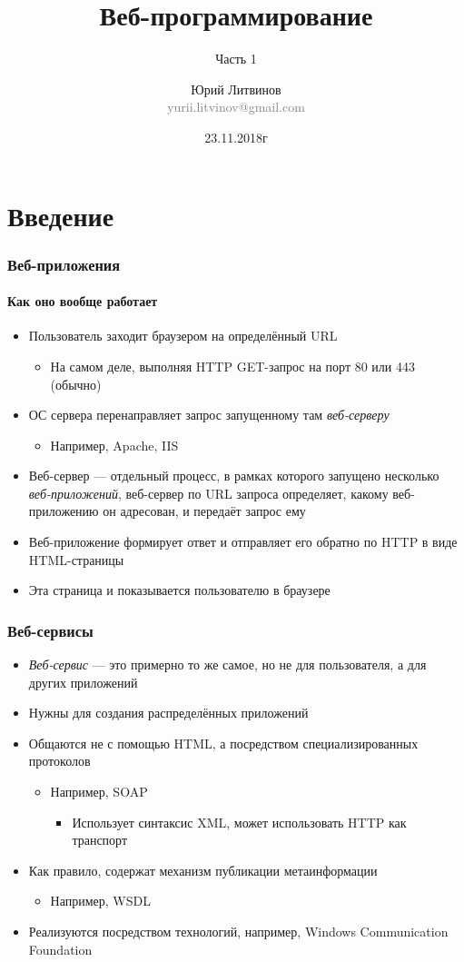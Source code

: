 \documentclass[xetex,mathserif,serif]{beamer}
\title{Веб-программирование}
\subtitle{Часть 1}
\author[Юрий Литвинов]{Юрий Литвинов\\\small{\textcolor{gray}{yurii.litvinov@gmail.com}}}
\date{23.11.2018г}
\begin{document}
	\frame{\titlepage}

	\section{Введение}

	\begin{frame}
		\frametitle{Веб-приложения}
		\framesubtitle{Как оно вообще работает}
		\begin{itemize}
			\item Пользователь заходит браузером на определённый URL
			\begin{itemize}
				\item На самом деле, выполняя HTTP GET-запрос на порт 80 или 443 (обычно)
			\end{itemize}
			\item ОС сервера перенаправляет запрос запущенному там \textit{веб-серверу}
			\begin{itemize}
				\item Например, Apache, IIS
			\end{itemize}
			\item Веб-сервер --- отдельный процесс, в рамках которого запущено несколько \textit{веб-приложений}, веб-сервер по URL запроса определяет, какому веб-приложению он адресован, и передаёт запрос ему
			\item Веб-приложение формирует ответ и отправляет его обратно по HTTP в виде HTML-страницы
			\item Эта страница и показывается пользователю в браузере
		\end{itemize}
	\end{frame}

	\begin{frame}
		\frametitle{Веб-сервисы}
		\begin{itemize}
			\item \textit{Веб-сервис} --- это примерно то же самое, но не для пользователя, а для других приложений
			\item Нужны для создания распределённых приложений
			\item Общаются не с помощью HTML, а посредством специализированных протоколов
			\begin{itemize}
				\item Например, SOAP 
				\begin{itemize}
					\item Использует синтаксис XML, может использовать HTTP как транспорт
				\end{itemize}
			\end{itemize}
			\item Как правило, содержат механизм публикации метаинформации
			\begin{itemize}
				\item Например, WSDL
			\end{itemize}
			\item Реализуются посредством технологий, например, Windows Communication Foundation
		\end{itemize}
	\end{frame}
\end{document}
